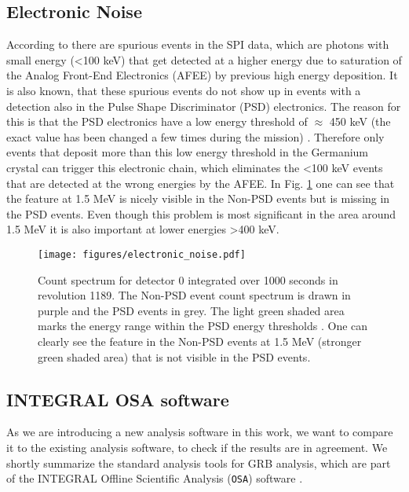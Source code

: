 \documentclass[twocolumn,traditabstract]{aa}
\begin{document}
\subsection{Electronic Noise}
\label{electronic}
According to \citet{spi_electronic_noise} there are spurious events in the SPI data, which are photons with small energy (<100 keV) that get detected at a higher energy due to saturation of the Analog Front-End Electronics (AFEE) by previous high energy deposition. It is also known, that these spurious events do not show up in events with a detection also in the Pulse Shape Discriminator (PSD) electronics. The reason for this is that the PSD electronics have a low energy threshold of $\approx$ 450 keV (the exact value has been changed a few times during the mission) \citep{spi_electronic_noise}. Therefore only events that deposit more than this low energy threshold in the Germanium crystal can trigger this electronic chain, which eliminates the <100 keV events that are detected at the wrong energies by the AFEE. In Fig. \ref{fig:electronic} one can see that the feature at 1.5 MeV is nicely visible in the Non-PSD events but is missing in the PSD events. Even though this problem is most significant in the area around 1.5 MeV it is also important at lower energies >400 keV.

\begin{figure}[ht]
    \begin{centering}
        \texttt{[image: figures/electronic\_noise.pdf]}
        \caption{Count spectrum for detector 0 integrated over 1000 seconds in revolution 1189. The Non-PSD event count spectrum is drawn in purple and the PSD events in grey. The light green shaded area marks the energy range within the PSD energy thresholds \citep{spi_electronic_noise}. One can clearly see the feature in the Non-PSD events at 1.5 MeV (stronger green shaded area) that is not visible in the PSD events.}
        \label{fig:electronic}
    \end{centering}
\end{figure}

\subsection{INTEGRAL OSA software}
\label{OSA}

As we are introducing a new analysis software in this work, we want to compare it to the existing analysis software, to check if the results are in agreement. We shortly summarize the standard analysis tools for GRB analysis, which are part of the INTEGRAL Offline Scientific Analysis ({\tt OSA}) software \citep{osa}.
\end{document}
